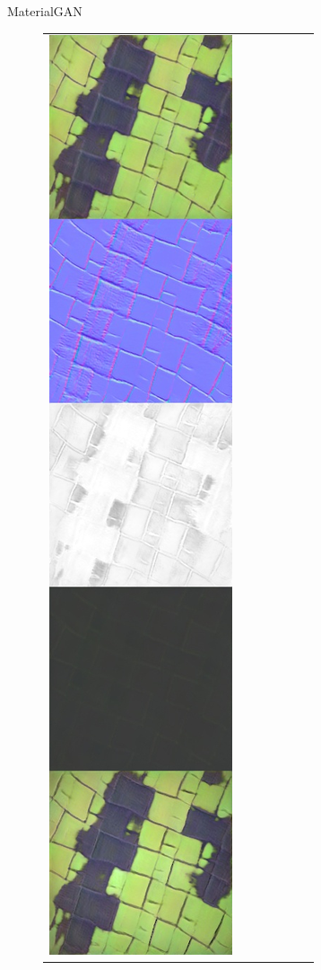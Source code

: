 \documentclass[final]{beamer}
\newlength{\twocolwid}
\newlength{\resLen}
\begin{document}
\begin{frame}[t]
\begin{columns}[t]
\begin{column}{\twocolwid}
\begin{block}{MaterialGAN}
\begin{figure}
\begin{tabular}{ccccccc}
					\includegraphics[width=\resLen]{others/matgan/05.jpg} &

\end{tabular}
\end{figure}
\end{block}
\end{column}
\end{columns}
\end{frame}
\end{document}
